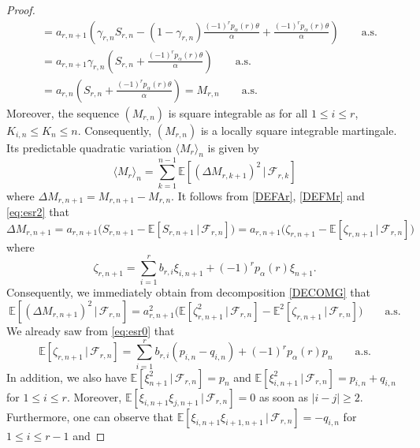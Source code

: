 \documentclass[twoside,12pt]{article}
\newcommand{\E}{\mathds{E}}
\begin{document}
\begin{proof}
\begin{align*}
&=a_{r,n+1}\left(\gamma_{r,n}S_{r,n}-(1-\gamma_{r,n})\frac{(-1)^{r}p_{\alpha}(r) \theta}{\alpha}+\frac{(-1)^{r} p_{\alpha}(r) \theta}{\alpha}\right) \qquad \text{a.s.}\\
&=a_{r,n+1}\gamma_{r,n} \left(S_{r,n}+\frac{(-1)^{r} p_{\alpha}(r) \theta}{\alpha}\right)  \qquad \text{a.s.}\\
&=a_{r,n} \left(S_{r,n}+\frac{(-1)^{r} p_{\alpha}(r) \theta}{\alpha}\right)= M_{r,n} \qquad \text{a.s.}
\end{align*}
Moreover, the sequence $(M_{r,n})$ is square integrable as for all $1 \leq i \leq r$, $K_{i,n}\leq K_n \leq n$. Consequently, $(M_{r,n})$ is a locally square
integrable martingale. Its predictable quadratic variation $\langle M_r \rangle_{n}$ is given by
\begin{equation}
\label{eq:CVMr1}
\langle M_r \rangle_{n} = \sum_{k=1}^{n-1} \E[(\Delta  M_{r,k+1})^{2}\,|\,\mathcal{F}_{r,k}]
\end{equation}
where $\Delta M_{r,n+1}=M_{r,n+1}-M_{r,n}$. It follows from \eqref{DEFAr}, \eqref{DEFMr} and \eqref{eq:esr2} that
\begin{equation}
\label{DECOMG}
\Delta M_{r,n+1}= a_{r,n+1} \Big( S_{r,n+1} - \E[S_{r,n+1}\,|\,\mathcal{F}_{r,n}]\Big)=a_{r,n+1} \Big( \zeta_{r,n+1} - \E[\zeta_{r,n+1}\,|\,\mathcal{F}_{r,n}]\Big)
\end{equation}
where
\begin{equation*}
\zeta_{r,n+1}= \sum_{i=1}^{r}b_{r,i}\xi_{i,n+1}+(-1)^r p_{\alpha}(r) \xi_{n+1}.
\end{equation*}
Consequently, we immediately obtain from decomposition \eqref{DECOMG} that
\begin{equation}
\label{eq:CVMr2}
\E[(\Delta M_{r,n+1})^{2}\,|\,\mathcal{F}_{r,n}]=a_{r,n+1}^{2}\Big(\E[\zeta_{r,n+1}^{2}\,|\,\mathcal{F}_{r,n}]-\E^2[\zeta_{r,n+1}\,|\,\mathcal{F}_{r,n}]\Big) \qquad \text{a.s.}
\end{equation}
We already saw from \eqref{eq:esr0} that
\begin{equation}
\label{CEzeta1}
\E[\zeta_{r,n+1}\,|\,\mathcal{F}_{r,n}]= \sum_{i=1}^{r}b_{r,i}(p_{i,n}-q_{i,n}) + (-1)^rp_{\alpha}(r) p_{n} \qquad \text{a.s.}
\end{equation}
In addition, we also have $\E[\xi_{n+1}^2\,|\,\mathcal{F}_{r,n}]=p_n$ and $\E[\xi_{i,n+1}^2\,|\,\mathcal{F}_{r,n}]=p_{i,n}+q_{i,n}$ for $1 \leq i \leq r$.
Moreover, $\E[\xi_{i,n+1} \xi_{j,n+1}\,|\,\mathcal{F}_{r,n}]=0$ as soon as $|i-j| \geq 2$. Furthermore, one can observe that $\E[\xi_{i,n+1} \xi_{i+1,n+1}\,|\,\mathcal{F}_{r,n}]=-q_{i, n}$ for $1 \leq i \leq r-1$ and

\end{proof}
\end{document}
